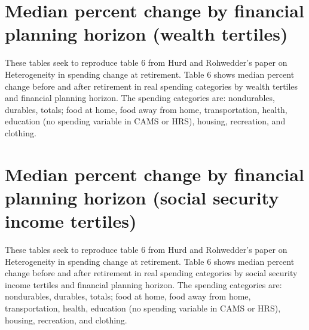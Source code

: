 \documentclass{article}
\begin{document}
\section{Median percent change by financial planning horizon (wealth tertiles)} 
These tables seek to reproduce table 6 from Hurd and Rohwedder's paper on Heterogeneity in spending change at retirement. Table 6 shows median percent change before and after retirement in real spending categories by wealth tertiles and financial planning horizon.
\newline
The spending categories are: nondurables, durables, totals; food at home, food away from home, transportation, health, education (no spending variable in CAMS or HRS), housing, recreation, and clothing.











\FloatBarrier

\section{Median percent change by financial planning horizon (social security income tertiles)} 
These tables seek to reproduce table 6 from Hurd and Rohwedder's paper on Heterogeneity in spending change at retirement. Table 6 shows median percent change before and after retirement in real spending categories by social security income tertiles and financial planning horizon.
\newline
The spending categories are: nondurables, durables, totals; food at home, food away from home, transportation, health, education (no spending variable in CAMS or HRS), housing, recreation, and clothing.











\end{document}
